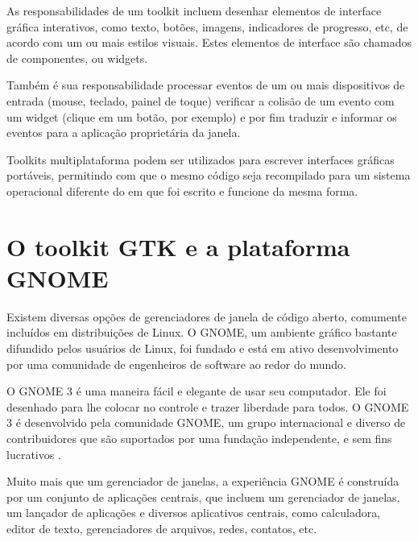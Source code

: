 As responsabilidades de um toolkit incluem desenhar elementos de interface
gráfica interativos, como texto, botões, imagens, indicadores de progresso,
etc, de acordo com um ou mais estilos visuais. Estes elementos de interface
são chamados de componentes, ou widgets.

Também é sua responsabilidade processar eventos de um ou mais dispositivos de
entrada (mouse, teclado, painel de toque) verificar a colisão de um evento com
um widget (clique em um botão, por exemplo) e por fim traduzir e informar os
eventos para a aplicação proprietária da janela.

Toolkits multiplataforma podem ser utilizados para escrever interfaces gráficas
portáveis, permitindo com que o mesmo código seja recompilado para um sistema
operacional diferente do em que foi escrito e funcione da mesma forma.

\section{O toolkit GTK e a plataforma GNOME}

Existem diversas opções de gerenciadores de janela de código aberto, comumente
incluídos em distribuições de Linux. O GNOME, um ambiente gráfico bastante
difundido pelos usuários de Linux, foi fundado e está em ativo desenvolvimento
por uma comunidade de engenheiros de software ao redor do mundo.

\begin{citacao}
    O GNOME 3 é uma maneira fácil e elegante de usar seu computador.
    Ele foi desenhado para lhe colocar no controle e trazer liberdade para
    todos. O GNOME 3 é desenvolvido pela comunidade GNOME, um grupo
    internacional e diverso de contribuidores que são suportados por uma
    fundação independente, e sem fins lucrativos \cite{gnome-org}.
\end{citacao}

Muito mais que um gerenciador de janelas, a experiência GNOME é construída por
um conjunto de aplicações centrais, que incluem um gerenciador de janelas, um
lançador de aplicações e diversos aplicativos centrais, como calculadora,
editor de texto, gerenciadores de arquivos, redes, contatos, etc.

